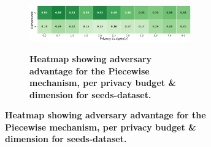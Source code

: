 \begin{figure}[H]
\begin{subfigure}[b]{0.85\textwidth}
            \begin{subfigure}[c]{1\textwidth}
                  \caption{\textbf{Heatmap showing adversary advantage for the Piecewise mechanism, per privacy budget \& dimension for seeds-dataset.}}
                  \includegraphics[width=1\textwidth]{Results/kd-laplace/piecewise/circle-dataset/shokri_mi_adv.png}
                  \label{fig:privacy_circle-dataset_adversial_advantage_piecewise}
            \end{subfigure}
      \end{subfigure}
      \hfill %
      \begin{subfigure}[b]{0.075\textwidth}

\end{subfigure}
\end{figure}
